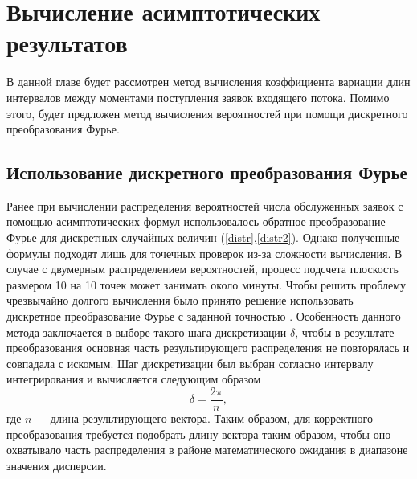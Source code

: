 \section {Вычисление асимптотических результатов}
В данной главе будет рассмотрен метод вычисления коэффициента вариации длин интервалов между моментами поступления заявок входящего потока. Помимо этого, будет предложен метод вычисления вероятностей при помощи дискретного преобразования Фурье.
\subsection{Использование дискретного преобразования Фурье}
Ранее при вычислении распределения вероятностей числа обслуженных заявок с помощью асимптотических формул использовалось обратное преобразование Фурье для дискретных случайных величин (\ref{distr},\ref{distr2}). Однако полученные формулы подходят лишь для точечных проверок из-за сложности вычисления. В случае с двумерным распределением вероятностей, процесс подсчета плоскость размером 10 на 10 точек может занимать около минуты. Чтобы решить проблему чрезвычайно долгого вычисления было принято решение использовать дискретное преобразование Фурье с заданной точностью \cite{nussbaumer1981fast,bergland1969guided}. Особенность данного метода заключается в выборе такого шага дискретизации $\delta$, чтобы в результате преобразования основная часть результирующего распределения не повторялась и совпадала с искомым. Шаг дискретизации был выбран согласно интервалу интегрирования и вычисляется следующим образом
\begin{equation*}
	\delta = \frac{2\pi}{n},
\end{equation*}
где $n$ --- длина результирующего вектора. Таким образом, для корректного преобразования требуется подобрать длину вектора таким образом, чтобы оно охватывало часть распределения в районе математического ожидания в диапазоне значения дисперсии. 

